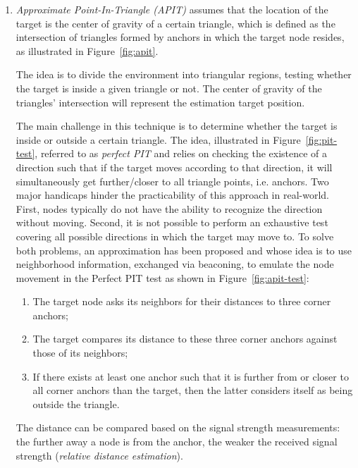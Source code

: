 \documentclass[a4paper,12pt]{article}
\begin{document}
\begin{enumerate}[label=(\alph*)]
\begin{enumerate}[label=(\roman*)]
    \item \textit{Approximate Point-In-Triangle (APIT)} assumes that the location of the target is the center of gravity of a certain triangle, which is defined as the intersection of triangles formed by anchors in which the target node resides, as illustrated in Figure~\ref{fig:apit}.

    The idea is to divide the environment into triangular regions, testing whether the target is inside a given triangle or not. The center of gravity of the triangles' intersection will represent the estimation target position.

    The main challenge in this technique is to determine whether the target is inside or outside a certain triangle. The idea, illustrated in Figure~\ref{fig:pit-test}, referred to as \textit{perfect PIT} and relies on checking the existence of a direction such that if the target moves according to that direction, it will simultaneously get further/closer to all triangle points, i.e. anchors.
    Two major handicaps hinder the practicability of this approach in real-world. First, nodes typically do not have the ability to recognize the direction without moving. Second, it is not possible to perform an exhaustive test covering all possible directions in which the target may move to. To solve both problems, an approximation has been proposed and whose idea is to use neighborhood information, exchanged via beaconing, to emulate the node movement in the Perfect PIT test as shown in Figure~\ref{fig:apit-test}:
    \begin{enumerate}[label=\arabic*.]
      \item The target node asks its neighbors for their distances to three corner anchors;
      \item The target compares its distance to these three corner anchors against those of its neighbors;
      \item If there exists at least one anchor such that it is further from or closer to all corner anchors than the target, then the latter considers itself as being outside the triangle.
    \end{enumerate}

    The distance can be compared based on the signal strength measurements: the further away a node is from the anchor, the weaker the received signal strength (\textit{relative distance estimation}).


\end{enumerate}
\end{enumerate}
\end{document}
